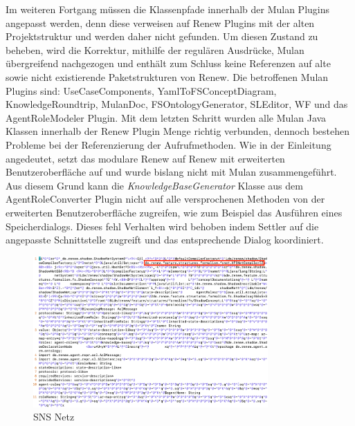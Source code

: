 	Im weiteren Fortgang müssen die Klassenpfade innerhalb der Mulan Plugins angepasst werden, denn diese verweisen auf Renew Plugins mit der alten Projektstruktur und werden daher nicht gefunden. Um diesen Zustand zu beheben, wird die Korrektur, mithilfe der regulären Ausdrücke, Mulan übergreifend nachgezogen und enthält zum Schluss keine Referenzen auf alte sowie nicht existierende Paketstrukturen von Renew. Die betroffenen Mulan Plugins sind: UseCaseComponents, YamlToFSConceptDiagram, KnowledgeRoundtrip, MulanDoc, FSOntologyGenerator, SLEditor, WF und das AgentRoleModeler Plugin. \newline
	Mit dem letzten Schritt wurden alle Mulan Java Klassen innerhalb der Renew Plugin Menge richtig verbunden, dennoch bestehen Probleme bei der Referenzierung der Aufrufmethoden. Wie in der Einleitung angedeutet, setzt das modulare Renew auf Renew mit erweiterten Benutzeroberfläche auf und wurde bislang nicht mit Mulan zusammengeführt. Aus diesem Grund kann die \textit{KnowledgeBaseGenerator} Klasse aus dem AgentRoleConverter Plugin nicht auf alle versprochenen Methoden von der erweiterten Benutzeroberfläche zugreifen, wie zum Beispiel das Ausführen eines Speicherdialogs. Dieses fehl Verhalten wird behoben indem Settler auf die angepasste Schnittstelle zugreift und das entsprechende Dialog koordiniert. \bigbreak

	\begin{figure}[h!]
	  \centering
	  \includegraphics[width=0.8\textwidth]{material/images/shadownet.png}
	  \caption{SNS Netz}
	  \label{fig:sns_netz}
	\end{figure}
	

